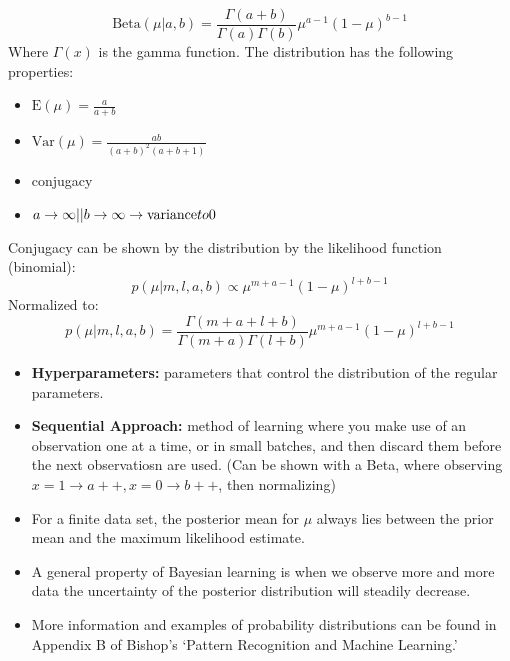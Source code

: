 \begin{defn}
	$$\text{Beta}(\mu |a,b)=\frac{\Gamma (a+b)}{\Gamma (a)\Gamma (b)}\mu^{a-1} (1-\mu )^{b-1}$$
	Where $\Gamma (x)$ is the gamma function.
	The distribution has the following properties:
	\begin{itemize}
		\item $\text{E}(\mu )=\frac{a}{a+b}$
		\item $\text{Var}(\mu )=\frac{ab}{(a+b)^2 (a+b+1)}$
		\item conjugacy
		\item ${a\to\infty || b\to\infty}\to \text{variance}\\to 0$ 
	\end{itemize}

	Conjugacy can be shown by the distribution by the likelihood function (binomial):
	$$p(\mu |m,l,a,b)\propto \mu^{m+a-1} (1-\mu )^{l+b-1}$$
	Normalized to:
	$$p(\mu |m,l,a,b)= \frac{\Gamma (m+a+l+b)}{\Gamma (m+a)\Gamma (l+b)} \mu^{m+a-1} (1-\mu )^{l+b-1}$$
\end{defn}

\begin{itemize}[--]
	\item \textbf{Hyperparameters:} parameters that control the distribution of the regular parameters.
	\item \textbf{Sequential Approach:} method of learning where you make use of an observation one at a time, or in small batches, and then discard them before the next observatiosn are used. (Can be shown with a Beta, where observing $x=1\to a++, x=0\to b++$, then normalizing)
	\item For a finite data set, the posterior mean for $\mu$ always lies between the prior mean and the maximum likelihood estimate.
	\item A general property of Bayesian learning is when we observe more and more data the uncertainty of the posterior distribution will steadily decrease.
	\item More information and examples of probability distributions can be found in Appendix B of Bishop's `Pattern Recognition and Machine Learning.'
\end{itemize}
